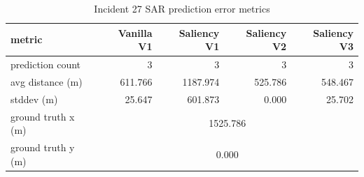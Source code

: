\begin{table}[ht]
\centering
\caption{Incident 27 SAR prediction error metrics}
\label{tab:sar-incident-27}
\begin{tabular}{lrrrr}
\hline
metric & Vanilla V1 & Saliency V1 & Saliency V2 & Saliency V3 \\
\hline
prediction count & 3 & 3 & 3 & 3 \\
avg distance (m) & 611.766 & 1187.974 & 525.786 & 548.467 \\
stddev (m) & 25.647 & 601.873 & 0.000 & 25.702 \\
ground truth x (m) & \multicolumn{4}{c}{1525.786} \\
ground truth y (m) & \multicolumn{4}{c}{0.000} \\
\hline
\end{tabular}
\end{table}
